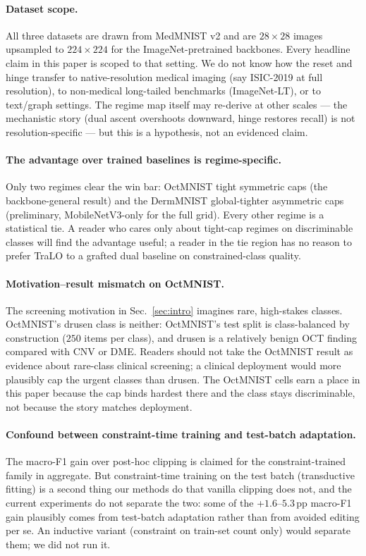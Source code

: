 \documentclass[10pt]{article}
\begin{document}
\paragraph{Dataset scope.}
All three datasets are drawn from MedMNIST v2 and are $28{\times}28$
images upsampled to $224{\times}224$ for the ImageNet-pretrained
backbones. Every headline claim in this paper is scoped to that setting.
We do not know how the reset and hinge transfer to native-resolution
medical imaging (say ISIC-2019 at full resolution), to non-medical
long-tailed benchmarks (ImageNet-LT), or to text/graph settings. The
regime map itself may re-derive at other scales --- the mechanistic story
(dual ascent overshoots downward, hinge restores recall) is not
resolution-specific --- but this is a hypothesis, not an evidenced claim.

\paragraph{The advantage over trained baselines is regime-specific.}
Only two regimes clear the win bar: OctMNIST tight symmetric caps (the
backbone-general result) and the DermMNIST global-tighter asymmetric caps
(preliminary, MobileNetV3-only for the full grid). Every other regime is
a statistical tie. A reader who cares only about tight-cap regimes on
discriminable classes will find the advantage useful; a reader in the
tie region has no reason to prefer TraLO to a grafted dual baseline on
constrained-class quality.

\paragraph{Motivation--result mismatch on OctMNIST.}
The screening motivation in Sec.~\ref{sec:intro} imagines rare, high-stakes
classes. OctMNIST's drusen class is neither: OctMNIST's test split is
class-balanced by construction ($250$ items per class), and drusen is a
relatively benign OCT finding compared with CNV or DME. Readers should
not take the OctMNIST result as evidence about rare-class clinical
screening; a clinical deployment would more plausibly cap the urgent
classes than drusen. The OctMNIST cells earn a place in this paper
because the cap binds hardest there and the class stays discriminable,
not because the story matches deployment.

\paragraph{Confound between constraint-time training and test-batch
adaptation.} The macro-F1 gain over post-hoc clipping is claimed for the
constraint-trained family in aggregate. But constraint-time training on
the test batch (transductive fitting) is a second thing our methods do
that vanilla clipping does not, and the current experiments do not
separate the two: some of the +$1.6$--$5.3$\,pp macro-F1 gain plausibly
comes from test-batch adaptation rather than from avoided editing per
se. An inductive variant (constraint on train-set count only) would
separate them; we did not run it.
\end{document}
